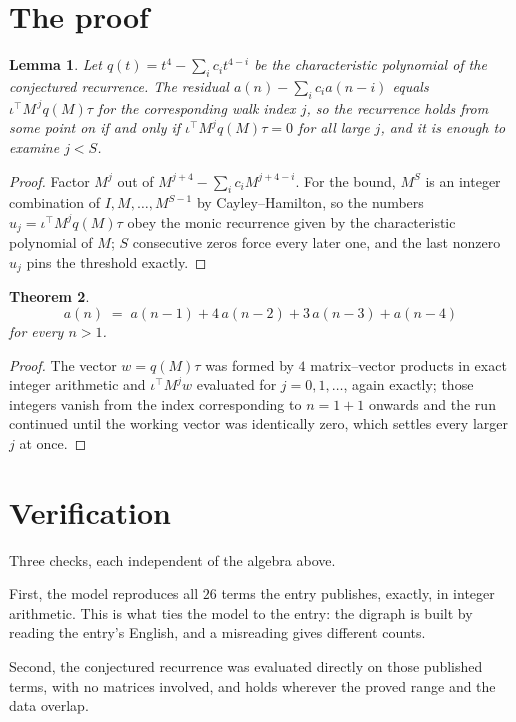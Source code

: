 \documentclass[11pt,a4paper]{article}
\theoremstyle{plain}
\newtheorem{theorem}{Theorem}
\newtheorem{lemma}[theorem]{Lemma}
\theoremstyle{definition}
\begin{document}
\section{The proof}

\begin{lemma}\label{lem:crit}
Let $q(t)=t^{4}-\sum_i c_it^{4-i}$ be the characteristic polynomial of the
conjectured recurrence. The residual $a(n)-\sum_ic_ia(n-i)$ equals
$\iota^{\!\top}M^{\,j}q(M)\tau$ for the corresponding walk index $j$, so the recurrence
holds from some point on if and only if $\iota^{\!\top}M^{j}q(M)\tau=0$ for all large $j$,
and it is enough to examine $j<S$.
\end{lemma}

\begin{proof}
Factor $M^{j}$ out of $M^{j+4}-\sum_ic_iM^{j+4-i}$. For the bound, $M^{S}$
is an integer combination of $I,M,\dots,M^{S-1}$ by Cayley--Hamilton, so the numbers
$u_j=\iota^{\!\top}M^{j}q(M)\tau$ obey the monic recurrence given by the characteristic
polynomial of $M$; $S$ consecutive zeros force every later one, and the last nonzero $u_j$
pins the threshold exactly.
\end{proof}

\begin{theorem}
\[
a(n)\;=\;a(n-1) + 4\,a(n-2) + 3\,a(n-3) + a(n-4)
\]
for every $n>1$.
\end{theorem}

\begin{proof}
The vector $w=q(M)\tau$ was formed by $4$ matrix--vector products in exact integer
arithmetic and $\iota^{\!\top}M^{j}w$ evaluated for $j=0,1,\dots$, again exactly; those
integers vanish from the index corresponding to $n=1+1$ onwards and the run continued
until the working vector was identically zero, which settles every larger $j$ at once.
\end{proof}

\section{Verification}

Three checks, each independent of the algebra above.

First, the model reproduces all $26$ terms the entry publishes, exactly, in integer
arithmetic. This is what ties the model to the entry: the digraph is built by reading the
entry's English, and a misreading gives different counts.

Second, the conjectured recurrence was evaluated directly on those published terms, with no
matrices involved, and holds wherever the proved range and the data overlap.
\end{document}
